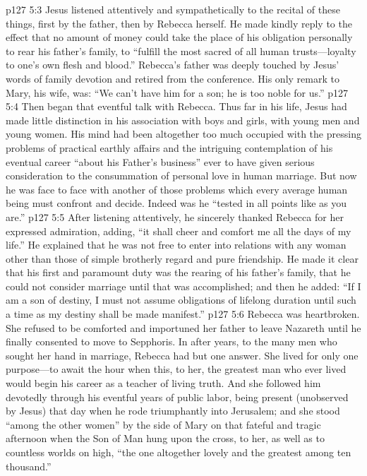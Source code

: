 \vs p127 5:3 Jesus listened attentively and sympathetically to the recital of these things, first by the father, then by Rebecca herself. He made kindly reply to the effect that no amount of money could take the place of his obligation personally to rear his father’s family, to \textcolor{ubdarkred}{“fulfill the most sacred of all human trusts---loyalty to one’s own flesh and blood.”} Rebecca’s father was deeply touched by Jesus’ words of family devotion and retired from the conference. His only remark to Mary, his wife, was: “We can’t have him for a son; he is too noble for us.”
\vs p127 5:4 Then began that eventful talk with Rebecca. Thus far in his life, Jesus had made little distinction in his association with boys and girls, with young men and young women. His mind had been altogether too much occupied with the pressing problems of practical earthly affairs and the intriguing contemplation of his eventual career “about his Father’s business” ever to have given serious consideration to the consummation of personal love in human marriage. But now he was face to face with another of those problems which every average human being must confront and decide. Indeed was he “tested in all points like as you are.”
\vs p127 5:5 After listening attentively, he sincerely thanked Rebecca for her expressed admiration, adding, \textcolor{ubdarkred}{“it shall cheer and comfort me all the days of my life.”} He explained that he was not free to enter into relations with any woman other than those of simple brotherly regard and pure friendship. He made it clear that his first and paramount duty was the rearing of his father’s family, that he could not consider marriage until that was accomplished; and then he added: \textcolor{ubdarkred}{“If I am a son of destiny, I must not assume obligations of lifelong duration until such a time as my destiny shall be made manifest.”}
\vs p127 5:6 Rebecca was heartbroken. She refused to be comforted and importuned her father to leave Nazareth until he finally consented to move to Sepphoris. In after years, to the many men who sought her hand in marriage, Rebecca had but one answer. She lived for only one purpose---to await the hour when this, to her, the greatest man who ever lived would begin his career as a teacher of living truth. And she followed him devotedly through his eventful years of public labor, being present (unobserved by Jesus) that day when he rode triumphantly into Jerusalem; and she stood “among the other women” by the side of Mary on that fateful and tragic afternoon when the Son of Man hung upon the cross, to her, as well as to countless worlds on high, “the one altogether lovely and the greatest among ten thousand.”
